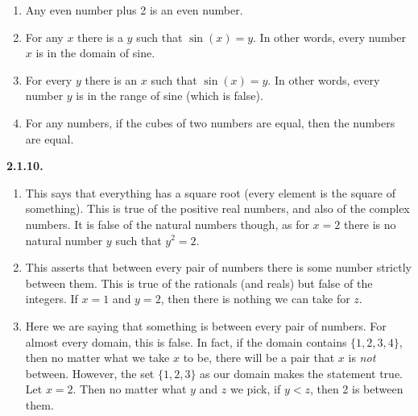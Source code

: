 \documentclass[10pt,]{book}
\theoremstyle{plain}
\theoremstyle{definition}
\theoremstyle{definition}
\theoremstyle{definition}
\theoremstyle{definition}
\numberwithin{equation}{chapter}
\newcommand{\lt}{<}
\begin{document}
\begin{enumerate}[label=(\alph*)]
\item\hypertarget{li-591}{}\hypertarget{p-1155}{}%
Any even number plus 2 is an even number.%
\item\hypertarget{li-592}{}\hypertarget{p-1156}{}%
For any \(x\) there is a \(y\) such that \(\sin(x) = y\). In other words, every number \(x\) is in the domain of sine.%
\item\hypertarget{li-593}{}\hypertarget{p-1157}{}%
For every \(y\) there is an \(x\) such that \(\sin(x) = y\). In other words, every number \(y\) is in the range of sine (which is false).%
\item\hypertarget{li-594}{}\hypertarget{p-1158}{}%
For any numbers, if the cubes of two numbers are equal, then the numbers are equal.%
\end{enumerate}
%
\par\smallskip
\noindent\textbf{2.1.10.} \hypertarget{p-1162}{}%
\leavevmode%
\begin{enumerate}[label=(\alph*)]
\item\hypertarget{li-598}{}\hypertarget{p-1163}{}%
This says that everything has a square root (every element is the square of something). This is true of the positive real numbers, and also of the complex numbers. It is false of the natural numbers though, as for \(x = 2\) there is no natural number \(y\) such that \(y^2 = 2\).%
\item\hypertarget{li-599}{}\hypertarget{p-1164}{}%
This asserts that between every pair of numbers there is some number strictly between them. This is true of the rationals (and reals) but false of the integers. If \(x = 1\) and \(y = 2\), then there is nothing we can take for \(z\).%
\item\hypertarget{li-600}{}\hypertarget{p-1165}{}%
Here we are saying that something is between every pair of numbers. For almost every domain, this is false. In fact, if the domain contains \(\{1,2,3, 4\}\), then no matter what we take \(x\) to be, there will be a pair that \(x\) is \emph{not} between. However, the set \(\{1,2,3\}\) as our domain makes the statement true. Let \(x = 2\). Then no matter what \(y\) and \(z\) we pick, if \(y \lt  z\), then 2 is between them.%
\end{enumerate}
%
\par\smallskip
\end{document}
